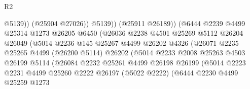 \begin{lexlean}{R2}
\begin{coremodule}
                                          @5139))
                                      (@25904 @27026))
                                    @5139))
                                (@25911 @26189))
                              (@6444
                                @2239
                                @4499
                                @25314
                                @1273
                                @26205
                                @6450
                                (@26036
                                  @2238
                                  @4501
                                  @25269
                                  @5112
                                  @26204
                                  @26049
                                  (@5014
                                    @2236
                                    @145
                                    @25267
                                    @4499
                                    @26202
                                    @4326
                                    (@26071
                                      @2235
                                      @25265
                                      @4499
                                      (@26200 @5114)
                                      @26202
                                      (@5014
                                        @2233
                                        @2008
                                        @25263
                                        @4503
                                        @26199
                                        @5114
                                        (@26084
                                          @2232
                                          @25261
                                          @4499
                                          @26198
                                          @26199
                                          (@5014
                                            @2223
                                            @2231
                                            @4499
                                            @25260
                                            @2222
                                            @26197
                                            (@5022 @2222)
                                            (@6444
                                              @2230
                                              @4499
                                              @25259
                                              @1273

\end{coremodule}
\end{lexlean}
